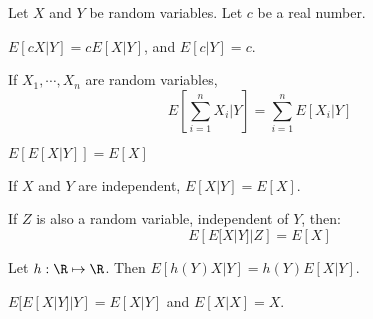 \documentclass[../Main.tex]{subfiles}
\begin{document}
\begin{propositions} {
        Let $X$ and $Y$ be random variables. Let $c$ be a real number.
        \label{propsCondExpecProperties}
    }
    \item $E[cX | Y] = cE[X | Y]$, and $E[c | Y] = c$. \label{propCondExpecConstant}
    \item If $X_1, \cdots, X_n$ are random variables,
        \begin{equation*}
            E\left[\sum_{i=1}^n X_i | Y\right] = \sum_{i=1}^n E[X_i | Y]
        \end{equation*}
        \label{propCondExpecSum}
    \item $E[E[X | Y]] = E[X]$ \label{propCondExpecTwice}
    \item If $X$ and $Y$ are independent, $E[X | Y] = E[X]$. \label{propCondExpecIndep}
    \item If $Z$ is also a random variable, independent of $Y$, then:
        \begin{equation*}
            E\left[E[X | Y] | Z\right] = E[X]
        \end{equation*}
        \label{propCondExpecSecondIndepRV}
    \item Let $h : \R \mapsto \R$. Then $E[h(Y) X | Y] = h(Y) E[X | Y]$. \label{propCondExpecFactorOutFunc}
    \item $E[E[X | Y] | Y] = E[X | Y]$ and $E[X | X] = X$. \label{propCondExpecTwiceGiven}
\end{propositions}
\end{document}
